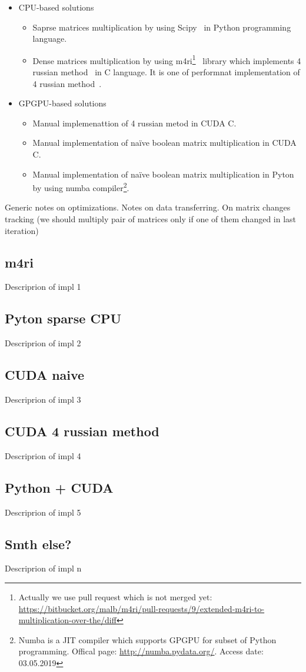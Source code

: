 \begin{itemize}
  \item CPU-based solutions 
  \begin{itemize}
    \item Saprse matrices multiplication by using Scipy~\cite{scipy} in Python programming language.
    \item Dense matrices multiplication by using m4ri\footnote{Actually we use pull request which is not merged yet: \url{https://bitbucket.org/malb/m4ri/pull-requests/9/extended-m4ri-to-multiplication-over-the/diff}}~\cite{M4RI} library which implements 4 russian method~\cite{arlazarov1970economical} in C language.
    It is one of performnat implementation of 4 russian method~\cite{albrechtefficient}.
  \end{itemize}
  \item GPGPU-based solutions
  \begin{itemize}
    \item Manual implemenattion of 4 russian metod in CUDA C.
    \item Manual implementation of na\"ive boolean matrix multiplication in CUDA C.
    \item Manual implementation of na\"ive boolean matrix multiplication in Pyton by using numba compiler\footnote{Numba is a JIT compiler which supports GPGPU for subset of Python programming. Offical page: \url{http://numba.pydata.org/}. Access date: 03.05.2019}. 
  \end{itemize}
\end{itemize}


Generic notes on optimizations.
Notes on data transferring.
On matrix changes tracking (we should multiply pair of matrices only if one of them changed in last iteration)

\subsection{m4ri}

Descriprion of impl 1~\cite{M4RI}

\subsection{Pyton sparse CPU}

Descriprion of impl 2

\subsection{CUDA naive}

Descriprion of impl 3

\subsection{CUDA 4 russian method}

Descriprion of impl 4

\subsection{Python + CUDA}

Descriprion of impl 5

\subsection{Smth else?}

Descriprion of impl n
